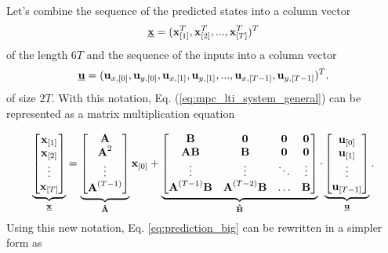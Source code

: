 \documentclass[a4paper,11pt,titlepage]{article}
\newcommand{\uvec}{\textbf{\underline{u}}}
\begin{document}
Let's combine the sequence of the predicted states into a column vector
\begin{equation}
\textbf{\underline{x}} = (\textbf{x}_{[1]}^T, \textbf{x}_{[2]}^T, ..., \textbf{x}_{[T]}^T)^T
\end{equation}
of the length $6T$ and the sequence of the inputs into a column vector
\begin{equation}
\uvec = (\textbf{u}_{x,[0]}, \textbf{u}_{y,[0]}, \textbf{u}_{x,[1]}, \textbf{u}_{y,[1]}, ..., \textbf{u}_{x,[T-1]}, \textbf{u}_{y,[T-1]})^T.
\end{equation}
of size $2T$. With this notation, Eq. (\ref{eq:mpc_lti_system_general}) can be represented as a matrix multiplication equation

\begin{equation}
\label{eq:prediction_big}
\underbrace{
\begin{bmatrix}
\textbf{x}_{[1]} \\
\textbf{x}_{[2]} \\
\vdots \\
\textbf{x}_{[T]} \\
\end{bmatrix}}_{\textbf{\underline{x}}}
=
\underbrace{
\begin{bmatrix}
\textbf{A} \\
\textbf{A}^2 \\
\vdots \\
\textbf{A}^{(T-1)} \\
\end{bmatrix}}_{\textbf{\^A}}
\textbf{x}_{[0]}
+
\underbrace{
\begin{bmatrix}
\textbf{B} & \textbf{0} & \textbf{0} & \textbf{0} \\
\textbf{AB} & \textbf{B} & \textbf{0} & \textbf{0} \\
\vdots & \vdots & \ddots & \vdots \\
\textbf{A}^{(T-1)}\textbf{B} & \textbf{A}^{(T-2)}\textbf{B} & \hdots & \textbf{B}
\end{bmatrix}
}_{\textbf{\^B}}
\cdot
\underbrace{
\begin{bmatrix}
\textbf{u}_{[0]} \\
\textbf{u}_{[1]} \\
\vdots \\
\textbf{u}_{[T-1]} \\
\end{bmatrix}}_{\uvec}.
\end{equation}
Using this new notation, Eq. \ref{eq:prediction_big} can be rewritten in a simpler form as
\end{document}
